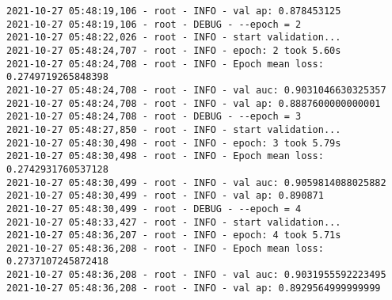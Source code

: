 \documentclass[11pt]{article}
\begin{document}
\begin{verbatim}
2021-10-27 05:48:19,106 - root - INFO - val ap: 0.878453125
2021-10-27 05:48:19,106 - root - DEBUG - --epoch = 2
2021-10-27 05:48:22,026 - root - INFO - start validation...
2021-10-27 05:48:24,707 - root - INFO - epoch: 2 took 5.60s
2021-10-27 05:48:24,708 - root - INFO - Epoch mean loss: 0.2749719265848398
2021-10-27 05:48:24,708 - root - INFO - val auc: 0.9031046630325357
2021-10-27 05:48:24,708 - root - INFO - val ap: 0.8887600000000001
2021-10-27 05:48:24,708 - root - DEBUG - --epoch = 3
2021-10-27 05:48:27,850 - root - INFO - start validation...
2021-10-27 05:48:30,498 - root - INFO - epoch: 3 took 5.79s
2021-10-27 05:48:30,498 - root - INFO - Epoch mean loss: 0.2742931760537128
2021-10-27 05:48:30,499 - root - INFO - val auc: 0.9059814088025882
2021-10-27 05:48:30,499 - root - INFO - val ap: 0.890871
2021-10-27 05:48:30,499 - root - DEBUG - --epoch = 4
2021-10-27 05:48:33,427 - root - INFO - start validation...
2021-10-27 05:48:36,207 - root - INFO - epoch: 4 took 5.71s
2021-10-27 05:48:36,208 - root - INFO - Epoch mean loss: 0.2737107245872418
2021-10-27 05:48:36,208 - root - INFO - val auc: 0.9031955592223495
2021-10-27 05:48:36,208 - root - INFO - val ap: 0.8929564999999999
\end{verbatim}
\end{document}
